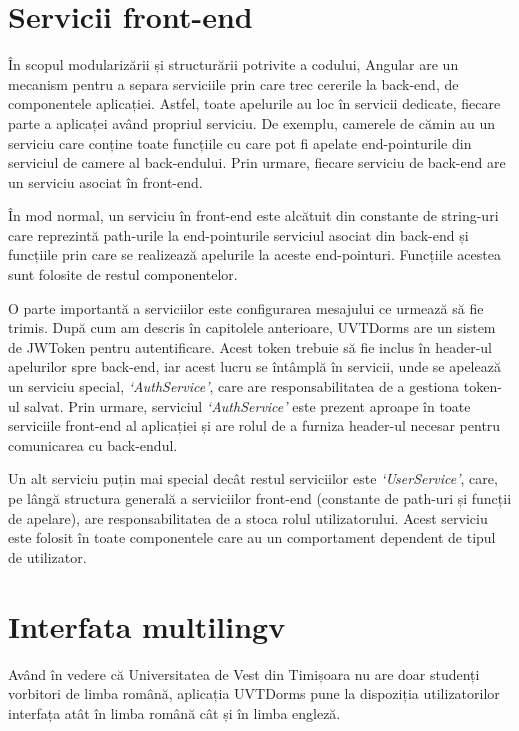 \documentclass[12pt,a4paper]{report}
\theoremstyle{definition}
\theoremstyle{remark}
\begin{document}
\section{Servicii front-end}

\par În scopul modularizării și structurării potrivite a codului, Angular are un mecanism pentru a separa serviciile prin care trec cererile la back-end, de componentele aplicației. Astfel, toate apelurile au loc în servicii dedicate, fiecare parte a aplicaței având propriul serviciu. De exemplu, camerele de cămin au un serviciu care conține toate funcțiile cu care pot fi apelate end-pointurile din serviciul de camere al back-endului. Prin urmare, fiecare serviciu de back-end are un serviciu asociat în front-end.

\par În mod normal, un serviciu în front-end este alcătuit din constante de string-uri care reprezintă path-urile la end-pointurile serviciul asociat din back-end și funcțiile prin care se realizează apelurile la aceste end-pointuri. Funcțiile acestea sunt folosite de restul componentelor.

\par O parte importantă a serviciilor este configurarea mesajului ce urmează să fie trimis. După cum am descris în capitolele anterioare, UVTDorms are un sistem de JWToken pentru autentificare. Acest token trebuie să fie inclus în header-ul apelurilor spre back-end, iar acest lucru se întâmplă în servicii, unde se apelează un serviciu special, \textit{`AuthService'}, care are responsabilitatea de a gestiona token-ul salvat. Prin urmare, serviciul \textit{`AuthService'} este prezent aproape în toate serviciile front-end al aplicației și are rolul de a furniza header-ul necesar pentru comunicarea cu back-endul.

\par Un alt serviciu puțin mai special decât restul serviciilor este \textit{`UserService'}, care, pe lângă structura generală a serviciilor front-end (constante de path-uri și funcții de apelare), are responsabilitatea de a stoca rolul utilizatorului. Acest serviciu este folosit în toate componentele care au un comportament dependent de tipul de utilizator.

\section{Interfata multilingv}

\par Având în vedere că Universitatea de Vest din Timișoara nu are doar studenți vorbitori de limba română, aplicația UVTDorms pune la dispoziția utilizatorilor interfața atât în limba română cât și în limba engleză.
\end{document}
